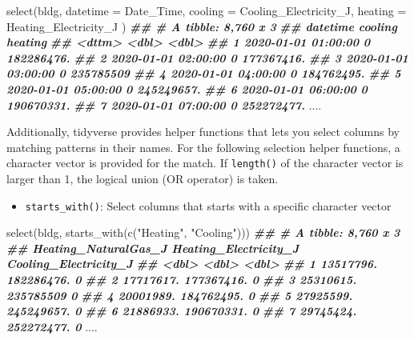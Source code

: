 \documentclass[
]{book}
\newenvironment{Shaded}{\begin{snugshade}}{\end{snugshade}}
\newcommand{\AttributeTok}[1]{\textcolor[rgb]{0.77,0.63,0.00}{#1}}
\newcommand{\DocumentationTok}[1]{\textcolor[rgb]{0.56,0.35,0.01}{\textbf{\textit{#1}}}}
\newcommand{\FunctionTok}[1]{\textcolor[rgb]{0.00,0.00,0.00}{#1}}
\newcommand{\NormalTok}[1]{#1}
\newcommand{\StringTok}[1]{\textcolor[rgb]{0.31,0.60,0.02}{#1}}
\providecommand{\tightlist}{%
  \setlength{\itemsep}{0pt}\setlength{\parskip}{0pt}}
\begin{document}
\begin{Shaded}
\begin{Highlighting}[]
\FunctionTok{select}\NormalTok{(bldg,}
  \AttributeTok{datetime =}\NormalTok{ Date\_Time,}
  \AttributeTok{cooling =}\NormalTok{ Cooling\_Electricity\_J,}
  \AttributeTok{heating =}\NormalTok{ Heating\_Electricity\_J}
\NormalTok{)}
\DocumentationTok{\#\# \# A tibble: 8,760 x 3}
\DocumentationTok{\#\#    datetime            cooling    heating}
\DocumentationTok{\#\#    \textless{}dttm\textgreater{}                \textless{}dbl\textgreater{}      \textless{}dbl\textgreater{}}
\DocumentationTok{\#\#  1 2020{-}01{-}01 01:00:00       0 182286476.}
\DocumentationTok{\#\#  2 2020{-}01{-}01 02:00:00       0 177367416.}
\DocumentationTok{\#\#  3 2020{-}01{-}01 03:00:00       0 235785509 }
\DocumentationTok{\#\#  4 2020{-}01{-}01 04:00:00       0 184762495.}
\DocumentationTok{\#\#  5 2020{-}01{-}01 05:00:00       0 245249657.}
\DocumentationTok{\#\#  6 2020{-}01{-}01 06:00:00       0 190670331.}
\DocumentationTok{\#\#  7 2020{-}01{-}01 07:00:00       0 252272477.}
\NormalTok{....}
\end{Highlighting}
\end{Shaded}

Additionally, tidyverse provides helper functions that lets you select columns by matching patterns in their names. For the following selection helper functions, a character vector is provided for the match. If \texttt{length()} of the character vector is larger than 1, the logical union (OR \texttt{\textbar{}} operator) is taken.

\begin{itemize}
\tightlist
\item
  \texttt{starts\_with()}: Select columns that starts with a specific character vector
\end{itemize}

\begin{Shaded}
\begin{Highlighting}[]
\FunctionTok{select}\NormalTok{(bldg, }\FunctionTok{starts\_with}\NormalTok{(}\FunctionTok{c}\NormalTok{(}\StringTok{"Heating"}\NormalTok{, }\StringTok{"Cooling"}\NormalTok{)))}
\DocumentationTok{\#\# \# A tibble: 8,760 x 3}
\DocumentationTok{\#\#    Heating\_NaturalGas\_J Heating\_Electricity\_J Cooling\_Electricity\_J}
\DocumentationTok{\#\#                   \textless{}dbl\textgreater{}                 \textless{}dbl\textgreater{}                 \textless{}dbl\textgreater{}}
\DocumentationTok{\#\#  1            13517796.            182286476.                     0}
\DocumentationTok{\#\#  2            17717617.            177367416.                     0}
\DocumentationTok{\#\#  3            25310615.            235785509                      0}
\DocumentationTok{\#\#  4            20001989.            184762495.                     0}
\DocumentationTok{\#\#  5            27925599.            245249657.                     0}
\DocumentationTok{\#\#  6            21886933.            190670331.                     0}
\DocumentationTok{\#\#  7            29745424.            252272477.                     0}
\NormalTok{....}
\end{Highlighting}
\end{Shaded}
\end{document}
